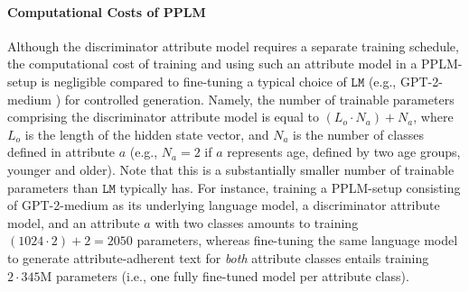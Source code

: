 \paragraph{Computational Costs of PPLM} Although the discriminator attribute model requires a separate training schedule, the computational cost of training and using such an attribute model in a PPLM-setup is negligible compared to fine-tuning a typical choice of $\texttt{LM}$ (e.g., GPT-2-medium \citep{radford2019language}) for controlled generation. Namely, the number of trainable parameters comprising the discriminator attribute model is equal to $(L_o \cdot N_a) + N_a$, where $L_o$ is the length of the hidden state vector, and $N_a$ is the number of classes defined in attribute $a$ (e.g., $N_a = 2$ if $a$ represents age, defined by two age groups, younger and older). Note that this is a substantially smaller number of trainable parameters than $\texttt{LM}$ typically has.
For instance, training a PPLM-setup consisting of GPT-2-medium as its underlying language model, a discriminator attribute model, and an attribute $a$ with two classes amounts to training $(1024 \cdot 2) + 2 = 2050$ parameters, whereas fine-tuning the same language model to generate attribute-adherent text for \textit{both} attribute classes entails training $2 \cdot 345\text{M}$ parameters (i.e., one fully fine-tuned model per attribute class).




